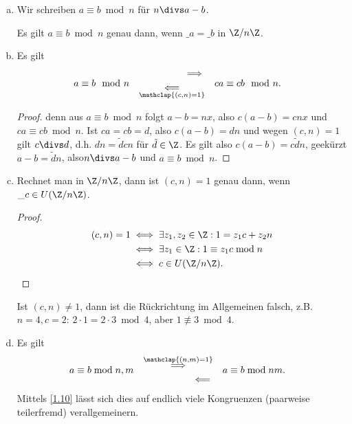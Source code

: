 \begin{nt} \label{1.12}
	\begin{enumerate}[a)]
		\item
			Wir schreiben $a \equiv b \bmod n$ für $n \divs a - b$.

			Es gilt $a \equiv b \bmod n$ genau dann, wenn $\_a = \_b$ in $\Z / n\Z$.
		\item
			Es gilt
			\begin{align*}
				a &\equiv b \mod n &
				&\begin{aligned}\implies \\ \underset{\mathclap{(c, n) = 1}}{\impliedby}\end{aligned}&
				ca &\equiv cb \mod n.
			\end{align*}
			\begin{proof}
				denn aus $a \equiv b \bmod n$ folgt $a -b = n x$, also $c(a-b) = cnx$ und $ca \equiv cb \bmod n$.
				Ist $ca = cb = d$, also $c(a-b) = dn$ und wegen $(c,n) = 1$ gilt $c\divs d$, d.h. $dn = \tilde d c n$ für $\tilde d \in \Z$.
				Es gilt also $c(a-b) = c \tilde d n$, geekürzt $a - b = \tilde d n$, also$n \divs a-b$ und $a \equiv b \bmod n$.
			\end{proof}
		\item
			Rechnet man in $\Z / n \Z$, dann ist $(c,n) = 1$ genau dann, wenn $\_c \in U(\Z / n \Z)$.
			\begin{proof}
				\begin{align*}
					(c,n) = 1
					&\iff \exists z_1, z_2 \in \Z : 1 = z_1 c + z_2 n \\
					&\iff \exists z_1 \in \Z : 1 \equiv z_1 c \bmod n \\
					&\iff c \in U(\Z / n \Z).
				\end{align*}
			\end{proof}
			Ist $(c, n) \neq 1$, dann ist die Rückrichtung im Allgemeinen falsch, z.B. $n = 4, c = 2$: $2 \cdot 1 = 2 \cdot 3 \bmod 4$, aber $1 \not\equiv 3 \bmod 4$.
		\item
			Es gilt
			\begin{align*}
				a &\equiv b \bmod n, m &
				&\begin{aligned}\overset{\mathclap{(n,m) = 1}}{\implies} \\ \impliedby\end{aligned}&
				a & \equiv b \bmod nm.
			\end{align*}
			Mittels \ref{1.10} lässt sich dies auf endlich viele Kongruenzen (paarweise teilerfremd) verallgemeinern.

\end{enumerate}
\end{nt}
